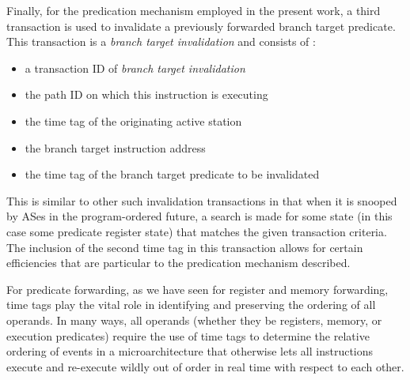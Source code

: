 \documentclass[10pt,dvips]{article}
\begin{document}
Finally, for the predication mechanism employed in the present
work, a third transaction is used to invalidate a previously
forwarded branch target predicate.  This transaction is
a \textit{branch target invalidation} and consists of :
%
\vspace{-0.05in}
\begin{itemize}
\vspace{-0.1in}
\item{a transaction ID of \textit{branch target invalidation}}
\vspace{-0.1in}
\item{the path ID on which this instruction is executing}
\vspace{-0.1in}
\item{the time tag of the originating active station}
\vspace{-0.1in}
\item{the branch target instruction address}
\vspace{-0.1in}
\item{the time tag of the branch target predicate to be invalidated}
\vspace{-0.1in}
\end{itemize}   
%
This is similar to other such invalidation transactions in
that when it is snooped by ASes in the program-ordered future,
a search is made for some state (in this case some predicate
register state) that matches the given transaction criteria.
The inclusion of the second time tag in this transaction allows
for certain efficiencies that are particular to the predication
mechanism described.

For predicate forwarding, as we have seen for register and
memory forwarding, time tags play the vital role in
identifying and preserving the ordering of all operands.
In many ways, all operands (whether they be registers, memory,
or execution predicates) require the use of time tags to
determine the relative ordering of events in a microarchitecture
that otherwise lets all instructions execute and re-execute
wildly out of order in real time with respect to each other.
%
%
\end{document}
